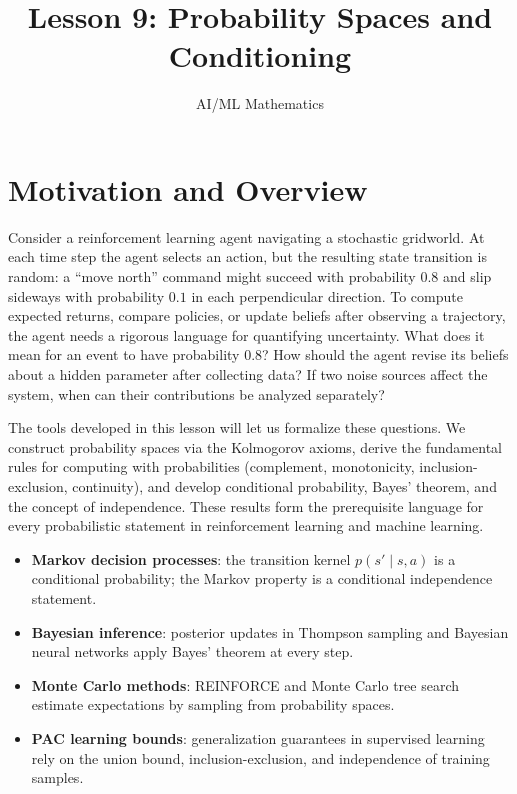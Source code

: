 \documentclass[11pt,a4paper]{article}
\title{Lesson 9: Probability Spaces and Conditioning}
\author{AI/ML Mathematics}
\date{}
\begin{document}
\maketitle
\tableofcontents
\newpage


\section{Motivation and Overview}
\label{sec:motivation}

Consider a reinforcement learning agent navigating a stochastic gridworld.
At each time step the agent selects an action, but the resulting state
transition is random: a ``move north'' command might succeed with probability
$0.8$ and slip sideways with probability $0.1$ in each perpendicular
direction. To compute expected returns, compare policies, or update beliefs
after observing a trajectory, the agent needs a rigorous language for
quantifying uncertainty. What does it mean for an event to have probability
$0.8$? How should the agent revise its beliefs about a hidden parameter after
collecting data? If two noise sources affect the system, when can their
contributions be analyzed separately?

The tools developed in this lesson will let us formalize these questions.
We construct probability spaces via the Kolmogorov axioms, derive the
fundamental rules for computing with probabilities (complement, monotonicity,
inclusion-exclusion, continuity), and develop conditional probability, Bayes'
theorem, and the concept of independence. These results form the
prerequisite language for every probabilistic statement in reinforcement
learning and machine learning.

\begin{rlconnection}[title={Why Probability Spaces Matter for RL/ML}]
\begin{itemize}[nosep]
    \item \textbf{Markov decision processes}: the transition kernel
    $p(s' \mid s, a)$ is a conditional probability; the Markov property is a
    conditional independence statement.
    \item \textbf{Bayesian inference}: posterior updates in Thompson sampling
    and Bayesian neural networks apply Bayes' theorem at every step.
    \item \textbf{Monte Carlo methods}: REINFORCE and Monte Carlo tree search
    estimate expectations by sampling from probability spaces.
    \item \textbf{PAC learning bounds}: generalization guarantees in
    supervised learning rely on the union bound, inclusion-exclusion, and
    independence of training samples.
\end{itemize}
\end{rlconnection}
\end{document}
